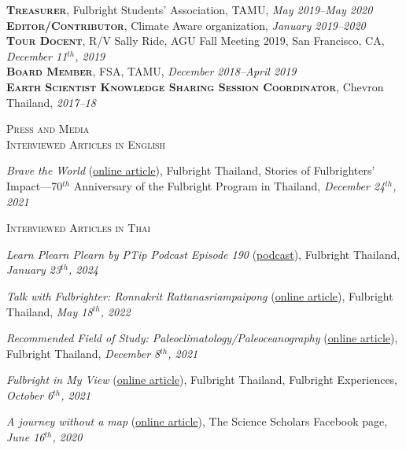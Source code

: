 \documentclass[10pt]{article}
\newcommand{\margintext}[1]{\marginnote{\normalsize\textbf #1 |}}
\begin{document}
\bigskip
\textsc{\textbf{Treasurer}}, Fulbright Students’ Association, TAMU, \textit{May 2019–May 2020} \\
\textsc{\textbf{Editor/Contributor}}, Climate Aware organization, \textit{January 2019–2020} \\
\textsc{\textbf{Tour Docent}}, R/V Sally Ride, AGU Fall Meeting 2019, San Francisco, CA, \textit{December 11$^{th}$, 2019}\\
\textsc{\textbf{Board Member}}, FSA, TAMU, \textit{December 2018–April 2019}\\
\textsc{\textbf{Earth Scientist Knowledge Sharing Session Coordinator}}, Chevron Thailand, \textit{2017–18}


\bigskip
\margintext{Outreach}
\textsc{Press and Media}\\
\textsc{Interviewed Articles in English}
\begin{etaremune}
\item \textit{Brave the World} (\href{https://issuu.com/fulbrightthailand/docs/storeis_fo_fulbrighters_impact}{online article}), Fulbright Thailand, Stories of Fulbrighters’ Impact—70$^{th}$ Anniversary of the Fulbright Program in Thailand, \textit{December 24$^{th}$, 2021}
\end{etaremune}

\textsc{Interviewed Articles in Thai}
\begin{etaremune}
\item \textit{Learn Plearn Plearn by PTip Podcast Episode 190} (\href{https://open.spotify.com/episode/5iJYhIJBjMwboy3JaC0Rp3?si=7d5a29447a72444b}{podcast}), Fulbright Thailand, \textit{January 23$^{th}$, 2024}
\item \textit{Talk with Fulbrighter: Ronnakrit Rattanasriampaipong} (\href{https://www.fulbrightthai.org/fulbright-stories/khuykab-fulbrighter-rnkrsdi-ratnsrii-amaiphphngs}{online article}), Fulbright Thailand, \textit{May 18$^{th}$, 2022}
\item \textit{Recommended Field of Study: Paleoclimatology/Paleoceanography} (\href{https://www.fulbrightthai.org/knowledge-sharing/saakhaa-yaakaenanam-1-paleoclimatology-paleoceanography}{online article}), Fulbright Thailand, \textit{December 8$^{th}$, 2021}
\item \textit{Fulbright in My View} (\href{https://anyflip.com/afeb/buat/?fbclid=IwAR08dv9XF7UCimtM9SjwICdCSwSQfuTHNtPbbaepT4WZlTcNRXB9eNtUsi8}{online article}), Fulbright Thailand, Fulbright Experiences, \textit{October 6$^{th}$, 2021}
\item \textit{A journey without a map} (\href{https://www.facebook.com/ThaiScienceScholars/photos/a.114754726700839/170670231109288/?type=3}{online article}), The Science Scholars Facebook page, \textit{June 16$^{th}$, 2020}
\end{etaremune}
\end{document}
